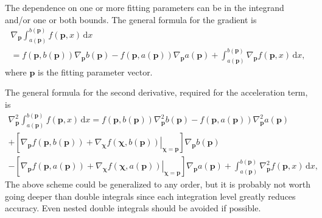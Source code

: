 \documentclass{article}
\newcommand{\D}{\,\textrm{d}}
\begin{document}
The dependence on one or more fitting parameters can be in the integrand and/or one or both bounds. The general formula for the gradient is
\begin{multline}
  \nabla_{\bm p} \int_{a(\bm p)}^{b(\bm p)} f(\bm p, x) \D x \\
  = f(\bm p, b(\bm p)) \nabla_{\bm p} b(\bm p) - f(\bm p, a(\bm p))
  \nabla_{\bm p} a(\bm p) + \int_{a(\bm p)}^{b(\bm p)} \nabla_{\bm p}
  f(\bm p, x) \D x,
\end{multline}
where $\bm p$ is the fitting parameter vector.

The general formula for the second derivative, required for the acceleration term, is
\begin{multline}
  \nabla_{\bm p}^2 \int_{a(\bm p)}^{b(\bm p)} f(\bm p,x) \D x = f(\bm
  p,b(\bm p)) \nabla_{\bm p}^2 b(\bm p) - f(\bm p,a(\bm p))
  \nabla_{\bm p}^2 a(\bm p) \\
  + \left[ \nabla_{\bm p} f(\bm p,b(\bm p)) + \left. \nabla_{\bm\chi}
      f(\bm\chi,b(\bm p)) \right|_{\bm\chi=\bm p} \right] \nabla_{\bm
    p} b(\bm p) \\
  - \left[ \nabla_{\bm p} f(\bm p,a(\bm p)) + \left. \nabla_{\bm\chi}
      f(\bm\chi,a(\bm p)) \right|_{\bm\chi=\bm p} \right] \nabla_{\bm
    p} a(\bm p) + \int_{a(\bm p)}^{b(\bm p)} \nabla_{\bm p}^2 f(\bm p,x)
  \D x,
\end{multline}
The above scheme could be generalized to any order, but it is probably not worth going deeper than double integrals since each integration level greatly reduces accuracy. Even nested double integrals should be avoided if possible.
\end{document}
